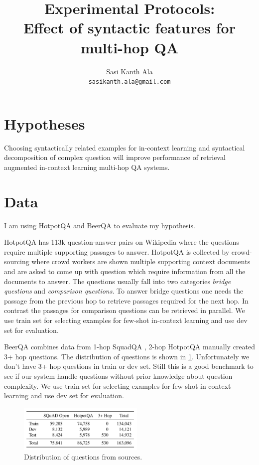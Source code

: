 \documentclass[11pt]{article}
\title{Experimental Protocols: \\
\large Effect of syntactic features for multi-hop QA }
\author{Sasi Kanth Ala\\
  \texttt{sasikanth.ala@gmail.com}
}
\begin{document}
\maketitle

\section{Hypotheses} 

Choosing syntactically related examples for in-context learning and syntactical decomposition of complex question will improve performance of retrieval augmented in-context learning multi-hop QA systems.

\section{Data}

I am using HotpotQA\cite{yang-etal-2018-hotpotqa} and BeerQA\cite{qi-etal-2021-answering} to evaluate my hypothesis.

HotpotQA has 113k question-answer pairs on Wikipedia where the questions require multiple supporting passages to answer. HotpotQA is collected by crowd-sourcing where crowd workers are shown multiple supporting context documents and are asked to come up with question which require information from all the documents to answer. The questions usually fall into two categories \emph{bridge questions} and \emph{comparison questions}. To answer bridge questions one needs the passage from the previous hop to retrieve passages required for the next hop. In contrast the passages for comparison questions can be retrieved in parallel. We use train set for selecting examples for few-shot in-context learning and use dev set for evaluation.

BeerQA combines data from 1-hop SquadQA \cite{rajpurkar-etal-2016-squad}, 2-hop HotpotQA manually created 3+ hop questions. The distribution of questions is shown in 
\ref{fig:BeerQA_dist}. Unfortunately we don't have 3+ hop questions in train or dev set. Still this is a good benchmark to see if our system handle questions without prior knowledge about question complexity. We use train set for selecting examples for few-shot in-context learning and use dev set for evaluation.  

\begin{figure}[htp]
    \centering
    \includegraphics[width=6cm]{BeerQA-dist.png}
    \caption{Distribution of questions from sources.\cite{qi-etal-2021-answering}}
    \label{fig:BeerQA_dist}
\end{figure}
\end{document}
